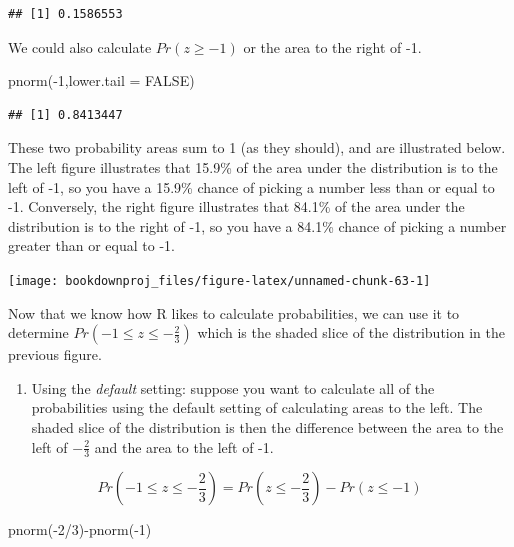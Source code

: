 \documentclass[
]{book}
\newenvironment{Shaded}{\begin{snugshade}}{\end{snugshade}}
\newcommand{\AttributeTok}[1]{\textcolor[rgb]{0.77,0.63,0.00}{#1}}
\newcommand{\ConstantTok}[1]{\textcolor[rgb]{0.00,0.00,0.00}{#1}}
\newcommand{\DecValTok}[1]{\textcolor[rgb]{0.00,0.00,0.81}{#1}}
\newcommand{\FunctionTok}[1]{\textcolor[rgb]{0.00,0.00,0.00}{#1}}
\newcommand{\NormalTok}[1]{#1}
\newcommand{\SpecialCharTok}[1]{\textcolor[rgb]{0.00,0.00,0.00}{#1}}
\providecommand{\tightlist}{%
  \setlength{\itemsep}{0pt}\setlength{\parskip}{0pt}}
\begin{document}
\begin{verbatim}
## [1] 0.1586553
\end{verbatim}

We could also calculate \(Pr(z\geq-1)\) or the area to the right of -1.

\begin{Shaded}
\begin{Highlighting}[]
\FunctionTok{pnorm}\NormalTok{(}\SpecialCharTok{{-}}\DecValTok{1}\NormalTok{,}\AttributeTok{lower.tail =} \ConstantTok{FALSE}\NormalTok{)}
\end{Highlighting}
\end{Shaded}

\begin{verbatim}
## [1] 0.8413447
\end{verbatim}

These two probability areas sum to 1 (as they should), and are illustrated below. The left figure illustrates that 15.9\% of the area under the distribution is to the left of -1, so you have a 15.9\% chance of picking a number less than or equal to -1. Conversely, the right figure illustrates that 84.1\% of the area under the distribution is to the right of -1, so you have a 84.1\% chance of picking a number greater than or equal to -1.

\begin{center}\texttt{[image: bookdownproj\_files/figure-latex/unnamed-chunk-63-1]} \end{center}

Now that we know how R likes to calculate probabilities, we can use it to determine \(Pr(-1 \leq z \leq -\frac{2}{3})\) which is the shaded slice of the distribution in the previous figure.

\begin{enumerate}
\def\labelenumi{\arabic{enumi}.}
\tightlist
\item
  Using the \emph{default} setting: suppose you want to calculate all of the probabilities using the default setting of calculating areas to the left. The shaded slice of the distribution is then the difference between the area to the left of \(-\frac{2}{3}\) and the area to the left of -1.
\end{enumerate}

\[Pr\left(-1 \leq z \leq -\frac{2}{3}\right)=Pr\left(z \leq -\frac{2}{3}\right) - Pr\left(z \leq -1\right)\]

\begin{Shaded}
\begin{Highlighting}[]
\FunctionTok{pnorm}\NormalTok{(}\SpecialCharTok{{-}}\DecValTok{2}\SpecialCharTok{/}\DecValTok{3}\NormalTok{)}\SpecialCharTok{{-}}\FunctionTok{pnorm}\NormalTok{(}\SpecialCharTok{{-}}\DecValTok{1}\NormalTok{)}
\end{Highlighting}
\end{Shaded}
\end{document}
